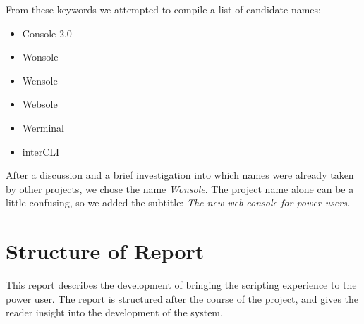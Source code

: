 From these keywords we attempted to compile a list of candidate names:
\begin{itemize}
\item Console 2.0
\item Wonsole
\item Wensole
\item Websole
\item Werminal
\item interCLI
\end{itemize}

After a discussion and a brief investigation into which names were already taken by other projects, we chose the name \emph{Wonsole}. The project name alone can be a little confusing, so we added the subtitle: \emph{The new web console for power users.}

\section{Structure of Report}
This report describes the development of bringing the scripting experience to the power user.
The report is structured after the course of the project, and gives the reader insight into the development of the system.

